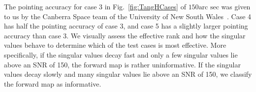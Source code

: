 The pointing accuracy for case 3 in Fig.~\ref{fig:TangHCases} of $150\text{arc sec}$ was given to us by the Canberra Space team of the University of New South Wales~\cite{CubeSatInternal}.
Case 4 has half the pointing accuracy of case 3, and case 5 has a slightly larger pointing accuracy than case 3.
We visually assess the effective rank and how the singular values behave to determine which of the test cases is most effective.
More specifically, if the singular values decay fast and only a few singular values lie above an SNR of 150, the forward map is rather uninformative.
If the singular values decay slowly and many singular values lie above an SNR of 150, we classify the forward map as informative.


